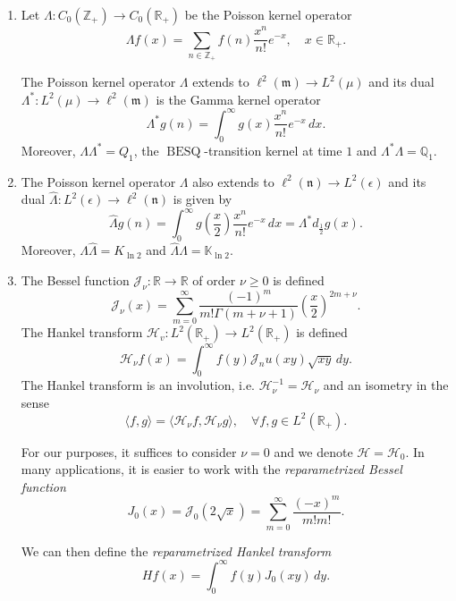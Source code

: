 \documentclass[11pt,a4,reqno]{amsart}
\numberwithin{equation}{section}
\theoremstyle{definition}
\theoremstyle{remark}
\newcommand{\bb}[1]{\mathbb{#1}}
\newcommand{\cl}[1]{\mathcal{#1}}
\newcommand{\frk}[1]{\mathfrak{#1}}
\newcommand{\R}{\bb{R}}
\newcommand{\Z}{\bb{Z}}
\DeclareMathOperator{\besq}{BESQ}
\newcommand{\beq}{\begin{equation}}
\newcommand{\eeq}{\end{equation}}
\begin{document}
	\begin{enumerate}
		
		\item Let $\Lambda : C_0(\Z_+) \to C_0(\R_+)$ be the Poisson kernel operator 
		\beq \label{eqn:poisson_kernel} \Lambda f(x) = \sum_{n \in \Z_+} f(n) \frac{x^n}{n!} e^{-x} , \quad x \in \R_+. \eeq
		
		The Poisson kernel operator $\Lambda$ extends to $\ell^2(\frk{m}) \to L^2(\mu)$ and its dual $\Lambda^* : L^2(\mu) \to \ell^2(\frk{m})$ is the Gamma kernel operator 
		\beq \label{eqn:gamma_kernel} \Lambda^*g(n) = \int_0^\infty g(x) \frac{x^n}{n!} e^{-x} \, dx . \eeq
		Moreover, $\Lambda \Lambda^* = Q_1$, the $\besq$-transition kernel at time $1$ and $\Lambda^* \Lambda = \bb{Q}_1$. 
		
		\item The Poisson kernel operator $\Lambda$ also extends to $\ell^2(\frk{n}) \to L^2(\epsilon)$ and its dual $\widehat{\Lambda} : L^2(\epsilon) \to \ell^2(\frk{n})$ is given by
		\beq \widehat{\Lambda} g(n) = \int_0^\infty g(\frac{x}{2}) \frac{x^n}{n!} e^{-x} \, dx = \Lambda^* d_{\frac{1}{2}} g (x). \eeq
		Moreover, $\Lambda \widehat{\Lambda} = K_{\ln 2}$ and $\widehat{\Lambda} \Lambda = \bb{K}_{\ln 2}$. 
		
		\item The Bessel function $\cl{J}_\nu : \R \to \R$ of order $\nu \geq 0$ is defined 
		\beq \cl{J}_\nu(x) = \sum_{m = 0}^\infty \frac{(-1)^m}{m! \Gamma(m + \nu + 1)} \left ( \frac{x}{2} \right )^{2m + \nu} . \eeq
		The Hankel transform $\cl{H}_v : L^2(\R_+) \to L^2(\R_+)$ is defined
		\beq \cl{H}_\nu f(x) = \int_0^\infty f(y) \cl{J}_nu(xy) \sqrt{xy} \, dy . \eeq
		The Hankel transform is an involution, i.e. $\cl{H}_\nu^{-1} = \cl{H}_\nu$ and an isometry in the sense
		\beq \langle f, g \rangle = \langle \cl{H}_\nu f, \cl{H}_\nu g \rangle, \quad \forall f, g \in L^2(\R_+) . \eeq
		
		For our purposes, it suffices to consider $\nu = 0$ and we denote $\cl{H} = \cl{H}_0$. In many applications, it is easier to work with the \textit{reparametrized Bessel function} 
		\beq J_0(x) = \cl{J}_0(2 \sqrt{x}) = \sum_{m = 0}^\infty \frac{(-x)^m}{m! m!} . \eeq
		
		We can then define the \textit{reparametrized Hankel transform}
		\beq Hf(x) = \int_0^\infty f(y) J_0(xy) \,dy . \eeq
		

\end{enumerate}
\end{document}
